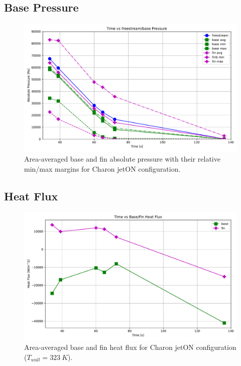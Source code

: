 \documentclass[12pt]{article}
\begin{document}
\subsection{Base Pressure}

\begin{figure}[H]
    \centering
    \includegraphics[width=\linewidth]{figs/base_pressure.pdf}
    \caption{Area-averaged base and fin absolute pressure with their relative min/max margins for Charon jetON configuration.}
    \label{fig:baseP}
\end{figure}

\subsection{Heat Flux}

\begin{figure}[H]
    \centering
    \includegraphics[width=\linewidth]{figs/base_HF.pdf}
    \caption{Area-averaged base and fin heat flux for Charon jetON configuration ($T_{wall} = 323~K$).}
    \label{fig:baseQ}
\end{figure}
\end{document}
